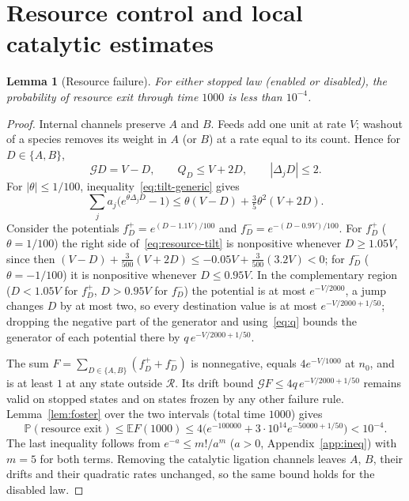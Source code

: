 \documentclass[11pt,a4paper]{article}
\theoremstyle{plain}
\newtheorem{lemma}[theorem]{Lemma}
\theoremstyle{definition}
\theoremstyle{remark}
\newcommand{\E}{\mathbb E}
\newcommand{\Prob}{\mathbb P}
\newcommand{\G}{\mathcal G}
\newcommand{\R}{\mathcal R}
\begin{document}
\section{Resource control and local catalytic estimates}\label{sec:resource}

\begin{lemma}[Resource failure]\label{lem:resource}
For either stopped law (enabled or disabled), the probability of resource exit through time $1000$ is less than $10^{-4}$.
\end{lemma}
\begin{proof}
Internal channels preserve $A$ and $B$. Feeds add one unit at rate $V$; washout of a species removes its weight in $A$ (or $B$) at a rate equal to its count. Hence for $D\in\{A,B\}$,
\[
\G D=V-D,\qquad Q_D\le V+2D,\qquad |\Delta_jD|\le2 .
\]
For $|\theta|\le1/100$, inequality~\eqref{eq:tilt-generic} gives
\begin{equation}\label{eq:resource-tilt}
\sum_j a_j\bigl(e^{\theta\Delta_jD}-1\bigr)\le\theta(V-D)+\tfrac35\theta^2(V+2D).
\end{equation}
Consider the potentials $f_D^+=e^{(D-1.1V)/100}$ and $f_D^-=e^{-(D-0.9V)/100}$. For $f_D^+$ ($\theta=1/100$) the right side of~\eqref{eq:resource-tilt} is nonpositive whenever $D\ge1.05V$, since then $(V-D)+\frac3{500}(V+2D)\le -0.05V+\frac{3}{500}(3.2V)<0$; for $f_D^-$ ($\theta=-1/100$) it is nonpositive whenever $D\le0.95V$. In the complementary region ($D<1.05V$ for $f^+_D$, $D>0.95V$ for $f^-_D$) the potential is at most $e^{-V/2000}$, a jump changes $D$ by at most two, so every destination value is at most $e^{-V/2000+1/50}$; dropping the negative part of the generator and using~\eqref{eq:q} bounds the generator of each potential there by $q\,e^{-V/2000+1/50}$.

The sum $F=\sum_{D\in\{A,B\}}(f_D^++f_D^-)$ is nonnegative, equals $4e^{-V/1000}$ at $n_0$, and is at least $1$ at any state outside $\R$. Its drift bound $\G F\le 4q\,e^{-V/2000+1/50}$ remains valid on stopped states and on states frozen by any other failure rule. Lemma~\ref{lem:foster} over the two intervals (total time $1000$) gives
\begin{equation}\label{eq:resource-budget}
\Prob(\text{resource exit})\le\E F(1000)\le 4\bigl(e^{-100000}+3\cdot10^{14}e^{-50000+1/50}\bigr)<10^{-4}.
\end{equation}
The last inequality follows from $e^{-a}\le m!/a^m$ ($a>0$, Appendix~\ref{app:ineq}) with $m=5$ for both terms. Removing the catalytic ligation channels leaves $A$, $B$, their drifts and their quadratic rates unchanged, so the same bound holds for the disabled law.
\end{proof}
\end{document}
